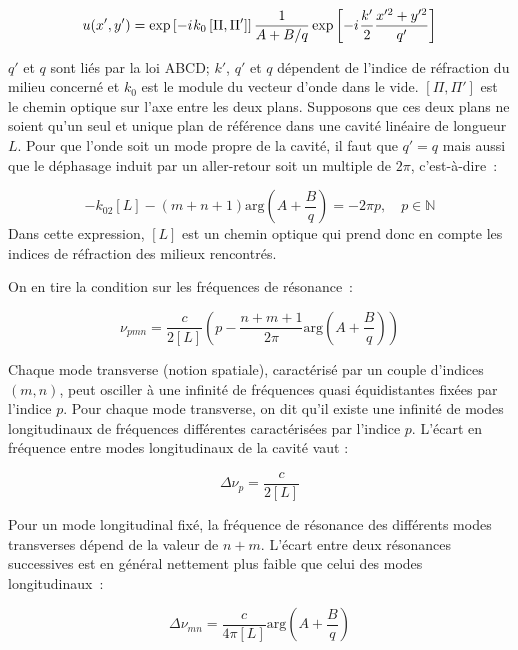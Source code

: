 \documentclass[a4paper]{book}
\newcommand{\iu}{{i\mkern1mu}}
\begin{document}
\begin{equation}
    u(x',y')=\exp\left[-\iu k_0 \left[\Pi, \Pi'\right]\right]\frac{1}{A+B/q}\exp\left[-\iu \frac{k'}{2}\frac{x'^2+y'^2}{q'}\right]
\end{equation}

$q'$ et $q$ sont liés par la loi ABCD; $k'$, $q'$ et $q$ dépendent de l'indice de réfraction du milieu concerné et $k_0$ est le module du vecteur d'onde dans le vide. $[\Pi, \Pi']$ est le chemin optique sur l'axe entre les deux plans.
Supposons que ces deux plans ne soient qu'un seul et unique plan de référence dans une cavité linéaire de longueur $L$. Pour que l'onde soit un mode propre de la cavité, il faut que $q'=q$ mais aussi que le déphasage induit par un aller-retour soit un multiple de $2\pi$, c'est-à-dire~:

\begin{equation}
    -k_02[L]-(m+n+1)\mathrm{arg}\left(A+\frac{B}{q}\right)=-2\pi p, \quad p\in \mathbb{N}
\end{equation}
Dans cette expression, $[L]$ est un chemin optique qui prend donc en compte les indices de réfraction des milieux rencontrés.

On en tire la condition sur les fréquences de résonance~:

\begin{equation}
    \nu_{pmn}=\frac{c}{2[L]}\left(p-\frac{n+m+1}{2\pi}\mathrm{arg}\left(A+\frac{B}{q}\right)\right)
\end{equation}

Chaque mode transverse (notion spatiale), caractérisé par un couple d'indices $(m,n)$, peut osciller à une infinité de fréquences quasi équidistantes fixées par l'indice $p$. Pour chaque mode transverse, on dit qu'il existe une infinité de modes longitudinaux de fréquences différentes caractérisées par l'indice $p$. L'écart en fréquence entre modes longitudinaux de la cavité vaut :

\begin{equation}
    \Delta\nu_p=\frac{c}{2[L]}
\end{equation}

Pour un mode longitudinal fixé, la fréquence de résonance des différents modes transverses dépend de la valeur de $n+m$. L'écart entre deux résonances successives est en général nettement plus faible que celui des modes longitudinaux~:

\begin{equation}
    \Delta\nu_{mn}=\frac{c}{4\pi[L]}\mathrm{arg}\left(A+\frac{B}{q}\right)
\end{equation}
\end{document}
